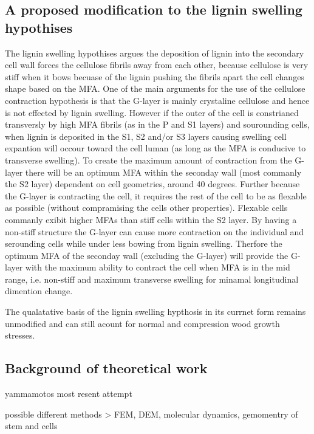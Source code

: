 \documentclass{article}
\begin{document}
\subsection{A proposed modification to the lignin swelling hypothises}
The lignin swelling hypothises argues the deposition of lignin into the
secondary cell wall forces the cellulose fibrils away from each other, because
cellulose is very stiff when it bows becuase of the lignin pushing the fibrils
apart the cell changes shape based on the MFA. One of the main arguments for the
use of the cellulose contraction hypothesis is that the G-layer is mainly
crystaline cellulose and hence is not effected by lignin swelling. However if
the outer of the cell is constrianed transversly by high MFA fibrils (as in the
P and S1 layers) and sourounding cells, when lignin is deposited in the S1, S2
and/or S3 layers causing swelling cell expantion will occour toward the cell luman (as long as the MFA
is conducive to transverse swelling). To create the maximum amount of
contraction from the G-layer there will be an optimum MFA within the seconday wall (most
commanly the S2 layer) dependent on cell geometries, around 40 degrees. Further
because the G-layer is contracting the cell, it requires the rest of the cell to
be as flexable as possible (without compramising the cells other properties).
Flexable cells commanly exibit higher MFAs than stiff cells within the S2 layer.
By having a non-stiff structure the G-layer can cause more contraction on the
individual and serounding cells while under less bowing from lignin swelling.
Therfore the optimum MFA of the seconday wall (excluding the G-layer) will
provide the G-layer with the maximum ability to contract the cell when MFA is
in the mid range, i.e. non-stiff and maximum transverse swelling for minamal
longitudinal dimention change.

The qualatative basis of the lignin swelling hypthosis in its currnet form
remains unmodified and can still acount for normal and compression wood growth
stresses.



\subsection{Background of theoretical work}

yammamotos most resent attempt

possible different methods > FEM, DEM, molecular dynamics, gemomentry of stem
and cells
\end{document}
